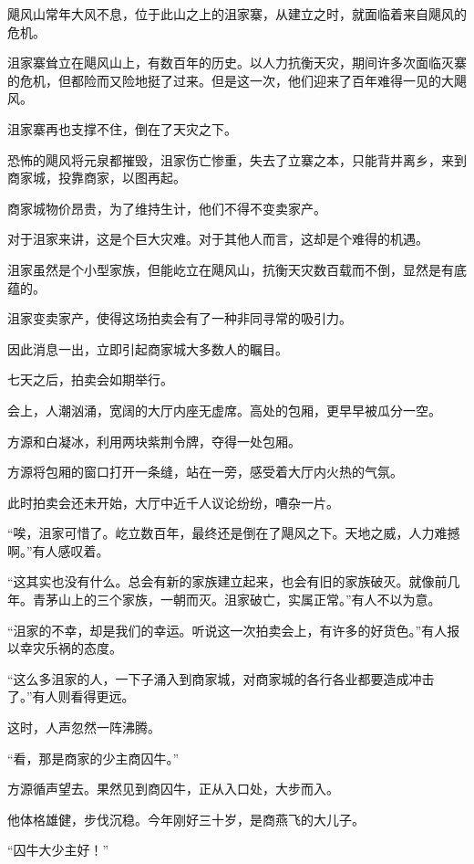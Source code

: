 
\begin{this_body}

飓风山常年大风不息，位于此山之上的沮家寨，从建立之时，就面临着来自飓风的危机。

沮家寨耸立在飓风山上，有数百年的历史。以人力抗衡天灾，期间许多次面临灭寨的危机，但都险而又险地挺了过来。但是这一次，他们迎来了百年难得一见的大飓风。

沮家寨再也支撑不住，倒在了天灾之下。

恐怖的飓风将元泉都摧毁，沮家伤亡惨重，失去了立寨之本，只能背井离乡，来到商家城，投靠商家，以图再起。

商家城物价昂贵，为了维持生计，他们不得不变卖家产。

对于沮家来讲，这是个巨大灾难。对于其他人而言，这却是个难得的机遇。

沮家虽然是个小型家族，但能屹立在飓风山，抗衡天灾数百载而不倒，显然是有底蕴的。

沮家变卖家产，使得这场拍卖会有了一种非同寻常的吸引力。

因此消息一出，立即引起商家城大多数人的瞩目。

七天之后，拍卖会如期举行。

会上，人潮汹涌，宽阔的大厅内座无虚席。高处的包厢，更早早被瓜分一空。

方源和白凝冰，利用两块紫荆令牌，夺得一处包厢。

方源将包厢的窗口打开一条缝，站在一旁，感受着大厅内火热的气氛。

此时拍卖会还未开始，大厅中近千人议论纷纷，嘈杂一片。

“唉，沮家可惜了。屹立数百年，最终还是倒在了飓风之下。天地之威，人力难撼啊。”有人感叹着。

“这其实也没有什么。总会有新的家族建立起来，也会有旧的家族破灭。就像前几年。青茅山上的三个家族，一朝而灭。沮家破亡，实属正常。”有人不以为意。

“沮家的不幸，却是我们的幸运。听说这一次拍卖会上，有许多的好货色。”有人报以幸灾乐祸的态度。

“这么多沮家的人，一下子涌入到商家城，对商家城的各行各业都要造成冲击了。”有人则看得更远。

这时，人声忽然一阵沸腾。

“看，那是商家的少主商囚牛。”

方源循声望去。果然见到商囚牛，正从入口处，大步而入。

他体格雄健，步伐沉稳。今年刚好三十岁，是商燕飞的大儿子。

“囚牛大少主好！”


\end{this_body}
